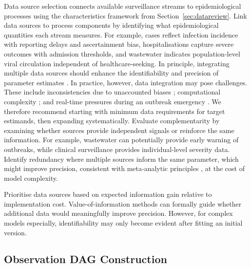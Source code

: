 \documentclass{article}
\begin{document}
Data source selection connects available surveillance streams to epidemiological processes using the characteristics framework from Section~\ref{sec:datareview}.
Link data sources to process components by identifying what epidemiological quantities each stream measures. 
For example, cases reflect infection incidence with reporting delays and ascertainment bias, hospitalisations capture severe outcomes with admission thresholds, and wastewater indicates population-level viral circulation independent of healthcare-seeking.
In principle, integrating multiple data sources should enhance the identifiability and precision of parameter estimates \citep{deangelis2018analysing, lison2024generative, russell2024combined, birrell2025real}. In practice, however, data integration may pose challenges. 
These include inconsistencies due to unaccounted biases \citep{presanis2013conflict,knock2021key, Ward2024-sp, corbella2022inferring}; computational complexity \citep{corbella2022inferring}; and real-time pressures during an outbreak emergency \citep{mccaw2023role}.
We therefore recommend starting with minimum data requirements for target estimands, then expanding systematically.
Evaluate complementarity by examining whether sources provide independent signals or reinforce the same information.
For example, wastewater can potentially provide early warning of outbreaks, while clinical surveillance provides individual-level severity data.
Identify redundancy where multiple sources inform the same parameter, which might improve precision, consistent with meta-analytic principles \citep{deangelis2018analysing,borenstein2021introduction}, at the cost of model complexity.

Prioritise data sources based on expected information gain relative to implementation cost.
Value-of-information methods \citep{jackson2019value,heath2024value} can formally guide whether additional data would meaningfully improve precision.
However, for complex models especially, identifiability may only become evident after fitting an initial version.

\subsection{Observation DAG Construction} \label{sec:observation}
\end{document}
